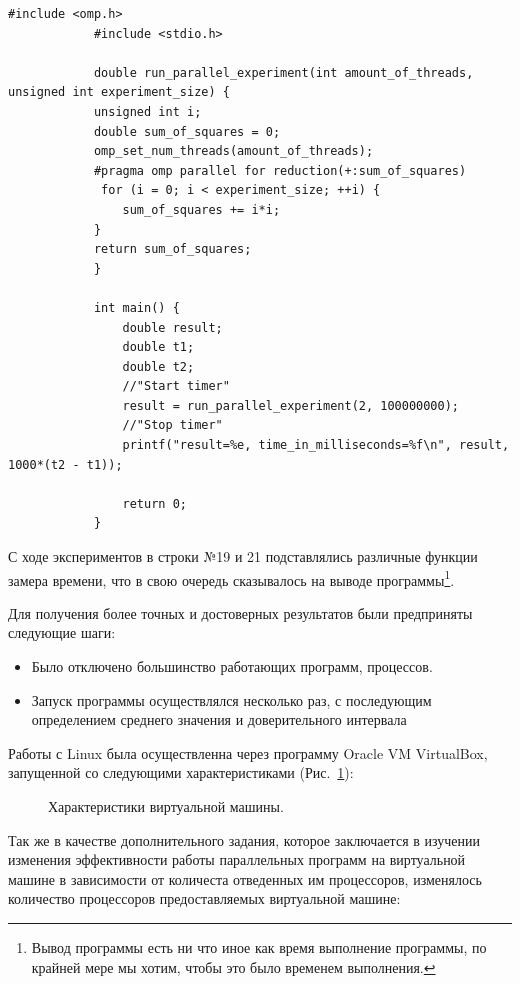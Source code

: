 \documentclass{article}
\begin{document}
			\begin{lstlisting}[label=some-code,caption=Тестовая программа]
			#include <omp.h>
			#include <stdio.h>
			
			double run_parallel_experiment(int amount_of_threads, unsigned int experiment_size) {
    		unsigned int i;
    		double sum_of_squares = 0;
    		omp_set_num_threads(amount_of_threads); 
    		#pragma omp parallel for reduction(+:sum_of_squares)
   			 for (i = 0; i < experiment_size; ++i) {
        		sum_of_squares += i*i;
    		}
   			return sum_of_squares;
			}

			int main() {
    			double result;
    			double t1;
    			double t2;
				//"Start timer"
    			result = run_parallel_experiment(2, 100000000);
				//"Stop timer"
    			printf("result=%e, time_in_milliseconds=%f\n", result, 1000*(t2 - t1));
    
    			return 0;
			}
		\end{lstlisting}
		\newpage
		
			С ходе экспериментов в строки №19 и 21 подставлялись различные функции замера времени, что в свою очередь сказывалось 		на выводе программы\footnote{Вывод программы есть ни что иное как время выполнение программы, по крайней мере мы 					хотим, чтобы это было временем выполнения.}.
			
			Для получения более точных и достоверных результатов были предприняты следующие шаги:
			
			\begin{itemize}
				\item Было отключено большинство работающих программ, процессов.
				\item Запуск программы осуществлялся несколько раз, с последующим определением среднего значения и 								доверительного интервала 
			\end{itemize}
			
			Работы с Linux была осуществленна через программу Oracle VM VirtualBox, запущенной со следующими характеристиками 				(Рис.~\ref{ris:VirtualBox_parametrs}):

		\begin{figure}[h!]
			\caption{Характеристики виртуальной машины.}
			\label{ris:VirtualBox_parametrs}
		\end{figure}
		\newpage
			Так же в качестве дополнительного задания, которое заключается в изучении изменения эффективности работы параллельных 		программ на виртуальной машине в зависимости от количеста отведенных им процессоров, изменялось количество процессоров 				предоставляемых виртуальной машине:
\end{document}
